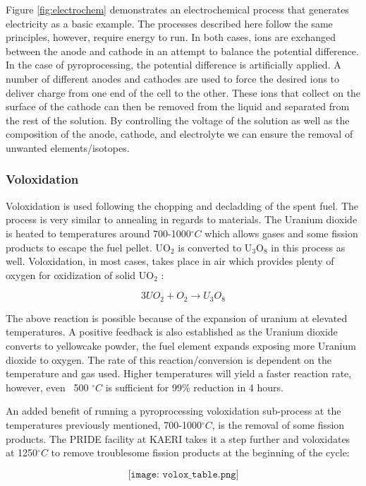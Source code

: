 Figure \ref{fig:electrochem} demonstrates an electrochemical process that generates electricity as a basic example.
The processes described here follow the same principles, however, require energy to run.
In both cases, ions are exchanged between the anode and cathode in an attempt to balance the potential difference.
In the case of pyroprocessing, the potential difference is artificially applied.
A number of different anodes and cathodes are used to force the desired ions to deliver charge from one end of the cell to the other.
These ions that collect on the surface of the cathode can then be removed from the liquid and separated from the rest of the solution.
By controlling the voltage of the solution as well as the composition of the anode, cathode, and electrolyte we can ensure the removal of unwanted elements/isotopes.


\subsubsection{Voloxidation}
Voloxidation is used following the chopping and decladding of the spent fuel. The process is very similar to annealing in regards to materials. The Uranium dioxide is heated to temperatures around 700-1000$^\circ C$ which allows gases and some fission products to escape the fuel pellet. UO$_2$ is converted to U$_3$O$_8$ in this process as well\cite{organisation}. Voloxidation, in most cases, takes place in air which provides plenty of oxygen for oxidization of solid UO$_2$ \cite{jubin_spent_2009}:

\[ 3UO_2 + O_2 \rightarrow U_3O_8 \]

The above reaction is possible because of the expansion of uranium at elevated temperatures. A positive feedback is also established as the Uranium dioxide converts to yellowcake powder, the fuel element expands exposing more Uranium dioxide to oxygen. The rate of this reaction/conversion is dependent on the temperature and gas used. Higher temperatures will yield a faster reaction rate, however, even ~500 $^\circ C$ is sufficient for 99\% reduction in 4 hours.

An added benefit of running a pyroprocessing voloxidation sub-process at the temperatures previously mentioned, 700-1000$^\circ C$, is the removal of some fission products. The PRIDE facility at KAERI takes it a step further and voloxidates at 1250$^\circ C$ to remove troublesome fission products at the beginning of the cycle\cite{organisation}:

\[ \texttt{[image: volox\_table.png]} \]

